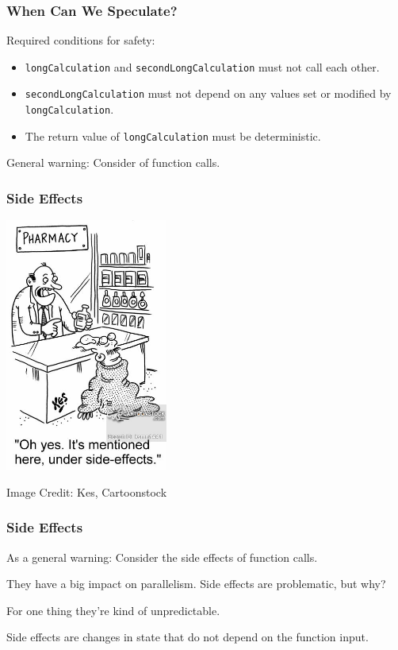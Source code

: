 \begin{frame}
  \frametitle{When Can We Speculate?}

  
  Required conditions for safety:

  \begin{itemize}
    \item {\tt longCalculation} and {\tt secondLongCalculation} must not call
      each other.
    \item {\tt secondLongCalculation} must not depend on
      any values set or modified by {\tt longCalculation}.
    \item The return value of {\tt longCalculation} must be deterministic.
  \end{itemize}

  General warning: Consider  of function calls.
  
\end{frame}



\begin{frame}
\frametitle{Side Effects}

\begin{center}
	\includegraphics[width=0.4\textwidth]{images/side-effects.jpg}
\end{center}
\hfill Image Credit: Kes, Cartoonstock


\end{frame}


\begin{frame}
\frametitle{Side Effects}

As a general warning: Consider the \alert{side effects} of function calls. 

They have a big impact on parallelism. Side effects are problematic, but why? 

For one thing they're kind of unpredictable. 

Side effects are changes in state that do not depend on the function input. 

\end{frame}


